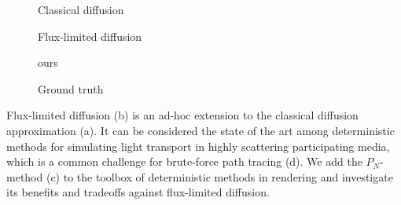 \teaser
{
\centering
\begin{subfigure}{0.2\linewidth}
\missingfigure{}
\caption{Classical diffusion}
\end{subfigure}%
\hspace{0.05\linewidth}
\begin{subfigure}{0.2\linewidth}
\missingfigure{}
\caption{Flux-limited diffusion}
\end{subfigure}%
\hspace{0.05\linewidth}
\begin{subfigure}{0.2\linewidth}
\missingfigure{}
\caption{ours}
\end{subfigure}%
\hspace{0.05\linewidth}
\begin{subfigure}{0.2\linewidth}
\missingfigure{}
\caption{Ground truth}
\end{subfigure}%
\icaption
{
Flux-limited diffusion (b) is an ad-hoc extension to the classical diffusion approximation (a). It can be considered the state of the art among deterministic methods for simulating light transport in highly scattering participating media, which is a common challenge for brute-force path tracing (d). We add the $P_N$-method (c) to the toolbox of deterministic methods in rendering and investigate its benefits and tradeoffs against flux-limited diffusion.
}
\label{fig:teaser}
}



\maketitle


